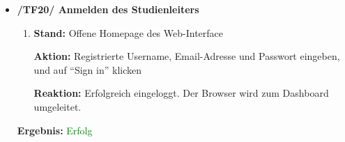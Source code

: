\documentclass[a4paper]{scrreprt}
\begin{document}
\begin{itemize}
		                          \item \textbf{/TF20/ Anmelden des Studienleiters}
		                              \begin{enumerate}
		                                  \item \par \textbf{Stand: }Offene Homepage des Web-Interface
		                                      \par \textbf{Aktion: }Registrierte Username, Email-Adresse und Passwort eingeben, und auf “Sign in” klicken
		                                      \par \textbf{Reaktion: }Erfolgreich eingeloggt. Der Browser wird zum Dashboard umgeleitet.
		                              \end{enumerate}		
		      		           \vspace*{0.3cm}
		      		           \par \textbf{Ergebnis: }\textcolor{green}{Erfolg}
		      		           \vspace*{0.6cm}


\end{itemize}
\end{document}
